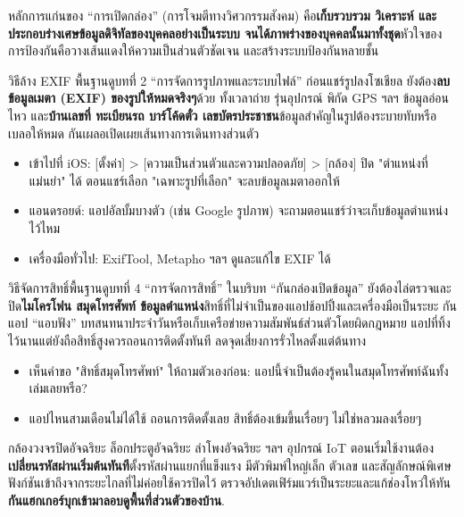 
หลักการแก่นของ “การเปิดกล่อง” (การโจมตีทางวิศวกรรมสังคม) คือ\textbf{เก็บรวบรวม วิเคราะห์ และประกอบร่างเศษข้อมูลดิจิทัลของบุคคลอย่างเป็นระบบ จนได้ภาพร่างของบุคคลนั้นมาทั้งชุด}หัวใจของการป้องกันคือวางเส้นแดงให้ความเป็นส่วนตัวชัดเจน และสร้างระบบป้องกันหลายชั้น


วิธีล้าง EXIF พื้นฐานดูบทที่ 2 “การจัดการรูปภาพและระบบไฟล์” ก่อนแชร์รูปลงโซเชียล ยังต้อง\textbf{ลบข้อมูลเมตา (EXIF) ของรูปให้หมดจริงๆ}ด้วย ทั้งเวลาถ่าย รุ่นอุปกรณ์ พิกัด GPS ฯลฯ ข้อมูลอ่อนไหว และ\textbf{บ้านเลขที่ ทะเบียนรถ บาร์โค้ดตั๋ว เลขบัตรประชาชน}ข้อมูลสำคัญในรูปต้องระบายทับหรือเบลอให้หมด กันเผลอเปิดเผยเส้นทางการเดินทางส่วนตัว

\begin{itemize}
  \item เข้าไปที่ iOS: [ตั้งค่า] > [ความเป็นส่วนตัวและความปลอดภัย] > [กล้อง] ปิด "ตำแหน่งที่แม่นยำ" ได้ ตอนแชร์เลือก "เฉพาะรูปที่เลือก" จะลบข้อมูลเมตาออกให้
  \item แอนดรอยด์: แอปอัลบั้มบางตัว (เช่น Google รูปภาพ) จะถามตอนแชร์ว่าจะเก็บข้อมูลตำแหน่งไว้ไหม
  \item เครื่องมือทั่วไป: ExifTool, Metapho ฯลฯ ดูและแก้ไข EXIF ได้
\end{itemize}


วิธีจัดการสิทธิ์พื้นฐานดูบทที่ 4 “การจัดการสิทธิ์” ในบริบท “กันกล่องเปิดข้อมูล” ยังต้องไล่ตรวจและปิด\textbf{ไมโครโฟน สมุดโทรศัพท์ ข้อมูลตำแหน่ง}สิทธิ์ที่ไม่จำเป็นของแอปช้อปปิ้งและเครื่องมือเป็นระยะ กันแอป “แอบฟัง” บทสนทนาประจำวันหรือเก็บเครือข่ายความสัมพันธ์ส่วนตัวโดยผิดกฎหมาย แอปที่ทิ้งไว้นานแต่ยังถือสิทธิ์สูงควรถอนการติดตั้งทันที ลดจุดเสี่ยงการรั่วไหลตั้งแต่ต้นทาง

\begin{itemize}
  \item เห็นคำขอ "สิทธิ์สมุดโทรศัพท์" ให้ถามตัวเองก่อน: แอปนี้จำเป็นต้องรู้คนในสมุดโทรศัพท์ฉันทั้งเล่มเลยหรือ?
  \item แอปไหนสามเดือนไม่ได้ใช้ ถอนการติดตั้งเลย สิทธิ์ต้องเข้มขึ้นเรื่อยๆ ไม่ใช่หลวมลงเรื่อยๆ
\end{itemize}


กล้องวงจรปิดอัจฉริยะ ล็อกประตูอัจฉริยะ ลำโพงอัจฉริยะ ฯลฯ อุปกรณ์ IoT ตอนเริ่มใช้งานต้อง\textbf{เปลี่ยนรหัสผ่านเริ่มต้นทันที}ตั้งรหัสผ่านแยกที่แข็งแรง มีตัวพิมพ์ใหญ่เล็ก ตัวเลข และสัญลักษณ์พิเศษ ฟังก์ชันเข้าถึงจากระยะไกลที่ไม่ค่อยใช้ควรปิดไว้ ตรวจอัปเดตเฟิร์มแวร์เป็นระยะและแก้ช่องโหว่ให้ทัน\textbf{กันแฮกเกอร์บุกเข้ามาลอบดูพื้นที่ส่วนตัวของบ้าน}.

